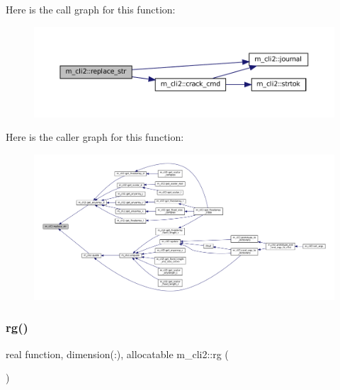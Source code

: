Here is the call graph for this function\+:\nopagebreak
\begin{figure}[H]
\begin{center}
\leavevmode
\includegraphics[width=350pt]{namespacem__cli2_a8f65cf1b227d837d89437368c660666f_cgraph}
\end{center}
\end{figure}
Here is the caller graph for this function\+:\nopagebreak
\begin{figure}[H]
\begin{center}
\leavevmode
\includegraphics[width=350pt]{namespacem__cli2_a8f65cf1b227d837d89437368c660666f_icgraph}
\end{center}
\end{figure}
\mbox{\label{namespacem__cli2_aff7a379ff1e7269001592f452ab017c8}} 
\subsubsection{\texorpdfstring{rg()}{rg()}}
{\footnotesize\ttfamily real function, dimension(\+:), allocatable m\+\_\+cli2\+::rg (\begin{DoxyParamCaption}{ }\end{DoxyParamCaption})\hspace{0.3cm}{\ttfamily [private]}}

\mbox{\label{namespacem__cli2_ade3a531cb1b2a60855ebe38031f7ed7a}} 
